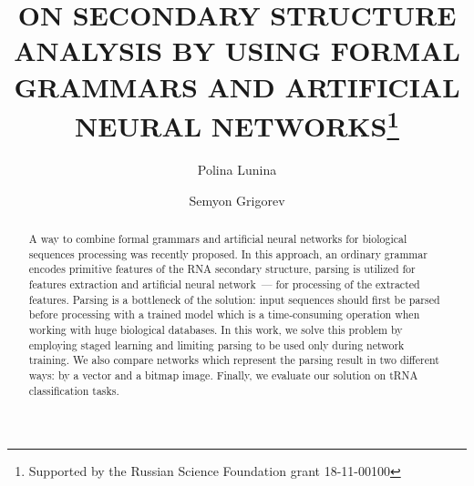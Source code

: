 \documentclass[runningheads]{llncs}
\begin{document}
%
\title{ON SECONDARY STRUCTURE ANALYSIS BY USING FORMAL GRAMMARS AND ARTIFICIAL NEURAL NETWORKS\thanks{Supported by the Russian Science Foundation grant 18-11-00100}}
%
%
\author{Polina Lunina \and
Semyon Grigorev}
%
%
%
\maketitle              %
%
\begin{abstract}
A way to combine formal grammars and artificial neural networks for biological sequences processing was recently proposed.
In this approach, an ordinary grammar encodes primitive features of the RNA secondary structure, parsing is utilized for features extraction and artificial neural network~--- for processing of the extracted features.
Parsing is a bottleneck of the solution: input sequences should first be parsed before processing with a trained model which is a time-consuming operation when working with huge biological databases.
In this work, we solve this problem by employing staged learning and limiting parsing to be used only during network training.
We also compare networks which represent the parsing result in two different ways: by a vector and a bitmap image.
Finally, we evaluate our solution on tRNA classification tasks.

\end{abstract}
%
%
%







%
%
%


\end{document}
